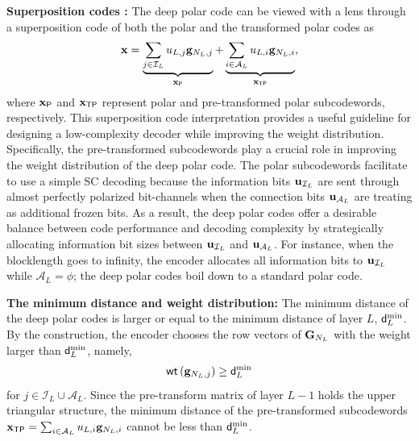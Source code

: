 \documentclass[conference]{IEEEtran}
\begin{document}
\vspace{0.1cm}


{\bf Superposition codes :}  The deep polar code can be viewed with a lens through a superposition code of both the polar and the transformed polar codes as 
\begin{align}
 	{\bf x} = \underbrace{\sum_{j\in \mathcal{I}_{L}}u_{L,j} {\bf g}_{N_L, j} }_{{\bf x}_{\sf P}}+ \underbrace{\sum_{i\in \mathcal{A}_{L}}u_{L,i} {\bf g}_{N_L, i}}_{{\bf x}_{\sf TP}},
 \end{align}
where ${\bf x}_{\sf P}$ and  ${\bf x}_{\sf TP}$ represent polar and pre-transformed polar subcodewords, respectively. This superposition code interpretation provides a useful guideline for designing a low-complexity decoder while improving the weight distribution. Specifically, the pre-transformed subcodewords play a crucial role in improving the weight distribution of the deep polar code. The polar subcodewords facilitate to use a simple SC decoding because the information bits ${\bf u}_{\mathcal{I}_{L}}$ are sent through almost perfectly polarized bit-channels when the connection bits ${\bf u}_{\mathcal{A}_{L}}$ are treating as additional frozen bits. As a result, the deep polar codes offer a desirable balance between code performance and decoding complexity by strategically allocating information bit sizes between ${\bf u}_{\mathcal{I}_{L}}$ and ${\bf u}_{\mathcal{A}_{L}}$. For instance, when the blocklength goes to infinity, the encoder allocates all information bits to ${\bf u}_{\mathcal{I}_{L}}$ while $\mathcal{A}_{L}=\phi$; the deep polar codes boil down to a standard polar code.  

 
 

 {\vspace{0.1cm}}

 {\bf The minimum distance and weight distribution:} The minimum distance of the deep polar codes is larger or equal to the minimum distance of layer $L$, ${\sf d}_{L}^{\rm min}$.  By the construction, the encoder chooses the row vectors of ${\bf G}_{N_L}$ with the weight larger than ${\sf d}_{L}^{\rm min}$, namely, 
 \begin{align}
{\sf wt}\left( {\bf g}_{N_L, j}\right)	\geq {\sf d}_{L}^{\rm min}
 \end{align}
for $j\in \mathcal{I}_L \cup \mathcal{A}_L$. Since the pre-transform matrix of layer $L-1$ holds the upper triangular structure, the minimum distance of the pre-transformed subcodewords ${\bf x}_{\sf TP}=\sum_{i\in \mathcal{A}_{L}}u_{L,i} {\bf g}_{N_L, i}$ cannot be less than ${\sf d}_{L}^{\rm min}$.
\end{document}
